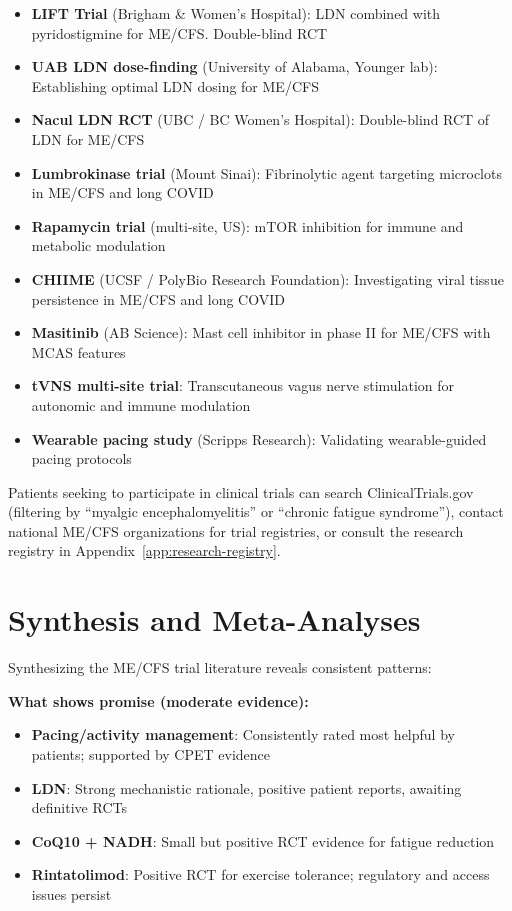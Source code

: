 \begin{itemize}
    \item \textbf{LIFT Trial} (Brigham \& Women's Hospital): LDN combined with pyridostigmine for ME/CFS. Double-blind RCT
    \item \textbf{UAB LDN dose-finding} (University of Alabama, Younger lab): Establishing optimal LDN dosing for ME/CFS
    \item \textbf{Nacul LDN RCT} (UBC / BC Women's Hospital): Double-blind RCT of LDN for ME/CFS
    \item \textbf{Lumbrokinase trial} (Mount Sinai): Fibrinolytic agent targeting microclots in ME/CFS and long COVID
    \item \textbf{Rapamycin trial} (multi-site, US): mTOR inhibition for immune and metabolic modulation
    \item \textbf{CHIIME} (UCSF / PolyBio Research Foundation): Investigating viral tissue persistence in ME/CFS and long COVID
    \item \textbf{Masitinib} (AB Science): Mast cell inhibitor in phase II for ME/CFS with MCAS features
    \item \textbf{tVNS multi-site trial}: Transcutaneous vagus nerve stimulation for autonomic and immune modulation
    \item \textbf{Wearable pacing study} (Scripps Research): Validating wearable-guided pacing protocols
\end{itemize}

Patients seeking to participate in clinical trials can search ClinicalTrials.gov (filtering by ``myalgic encephalomyelitis'' or ``chronic fatigue syndrome''), contact national ME/CFS organizations for trial registries, or consult the research registry in Appendix~\ref{app:research-registry}.

\section{Synthesis and Meta-Analyses}
\label{sec:trials-synthesis}

Synthesizing the ME/CFS trial literature reveals consistent patterns:

\textbf{What shows promise (moderate evidence):}

\begin{itemize}
    \item \textbf{Pacing/activity management}: Consistently rated most helpful by patients; supported by CPET evidence
    \item \textbf{LDN}: Strong mechanistic rationale, positive patient reports, awaiting definitive RCTs
    \item \textbf{CoQ10 + NADH}: Small but positive RCT evidence for fatigue reduction
    \item \textbf{Rintatolimod}: Positive RCT for exercise tolerance; regulatory and access issues persist
\end{itemize}

